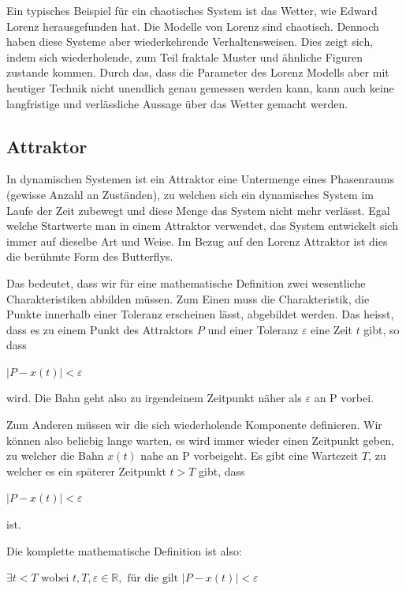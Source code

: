 Ein typisches Beispiel für ein chaotisches System ist das Wetter, wie Edward Lorenz herausgefunden hat. Die Modelle von Lorenz sind chaotisch. Dennoch haben diese Systeme aber	 wiederkehrende Verhaltensweisen. Dies zeigt sich, indem sich wiederholende, zum Teil fraktale Muster und ähnliche Figuren zustande kommen. Durch das, dass die Parameter des Lorenz Modells aber mit heutiger Technik nicht unendlich genau gemessen werden kann, kann auch keine langfristige und verlässliche Aussage über das Wetter gemacht werden. 

\subsection{Attraktor}
In dynamischen Systemen ist ein Attraktor eine Untermenge eines Phasenraums (gewisse Anzahl an Zuständen), zu welchen sich ein dynamisches System im Laufe der Zeit zubewegt und diese Menge das System nicht mehr verlässt\cite{wikiattraktor}. 
Egal welche Startwerte man in einem Attraktor verwendet, das System entwickelt sich immer auf dieselbe Art und Weise. Im Bezug auf den Lorenz Attraktor ist dies die berühmte Form des Butterflys. 

Das bedeutet, dass wir für eine mathematische Definition zwei wesentliche Charakteristiken abbilden müssen. Zum Einen muss die Charakteristik, die Punkte innerhalb einer Toleranz erscheinen lässt, abgebildet werden. Das heisst, dass es zu einem Punkt des Attraktors $P$ und einer Toleranz $\varepsilon$ eine Zeit $t$ gibt, so dass 

\begin{center}
$|P - x(t)| < \varepsilon$
\end{center}
wird. Die Bahn geht also zu irgendeinem Zeitpunkt näher als $\varepsilon$ an P vorbei.

Zum Anderen müssen wir die sich wiederholende Komponente definieren. Wir können also beliebig lange warten, es wird immer wieder einen Zeitpunkt geben, zu welcher die Bahn $x(t)$ nahe an P vorbeigeht. Es gibt eine Wartezeit $T$, zu welcher es ein späterer Zeitpunkt $t > T$ gibt, dass
\begin{center}
	$|P - x(t) |< \varepsilon$
\end{center}
ist.

Die komplette mathematische Definition ist also:

\begin{center}\label{Attraktor}
$	\exists t < T \text{ wobei } t,T,\varepsilon \in \mathbb{R}, \text{ für die gilt } |P - x(t) |< \varepsilon$
\end{center}

